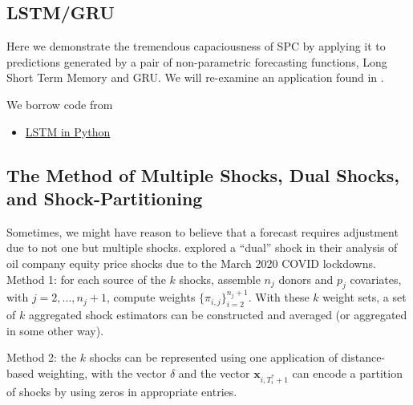 \documentclass[11pt]{article}
\newcommand{\x}{\textbf{x}}
\theoremstyle{definition}
\begin{document}
\subsection{LSTM/GRU}

Here we demonstrate the tremendous capaciousness of SPC by applying it to predictions generated by a pair of non-parametric forecasting functions, Long Short Term Memory and GRU.  We will re-examine an application found in \cite{lin2021minimizing}.

We borrow code from \cite{Brownlee_2022}

\begin{itemize}
  \item \href{https://machinelearningmastery.com/time-series-prediction-lstm-recurrent-neural-networks-python-keras/}{LSTM in Python}
\end{itemize}



\subsection{The Method of Multiple Shocks, Dual Shocks, and Shock-Partitioning}

Sometimes, we might have reason to believe that a forecast requires adjustment due to not one but multiple shocks.  \cite{lin2021minimizing} explored a ``dual'' shock in their analysis of oil company equity price shocks due to the March 2020 COVID lockdowns.  \\

Method 1: for each source of the $k$ shocks, assemble $n_{j}$ donors and $p_{j}$ covariates, with $j=2,...,n_{j}+1$, compute weights $\{\pi_{i,j}\}^{n_{j}+1}_{i=2}$.  With these $k$ weight sets, a set of $k$ aggregated shock estimators can be constructed and averaged (or aggregated in some other way).

Method 2: the $k$ shocks can be represented using one application of distance-based weighting, with the vector $\delta$ and the vector $\x_{i,T^{*}_{i}+1}$ can encode a partition of shocks by using zeros in appropriate entries.
\end{document}
